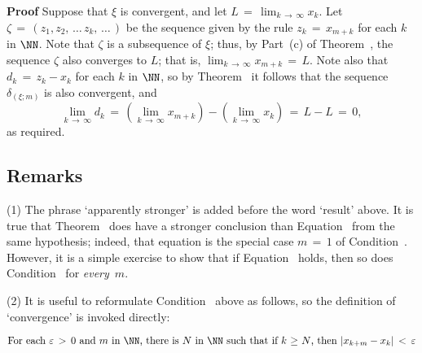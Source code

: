 \V

        {\bf Proof} Suppose that ${\xi}$ is convergent, and let $L \,=\, \lim_{k \,{\rightarrow}\, {\infty}} x_{k}$.
    Let ${\zeta} \,=\, (z_{1},z_{2},\,{\ldots}\,z_{k},\,{\ldots}\,)$ be the sequence given by the rule $z_{k} \,=\, x_{m+k}$ for each $k$ in ${\NN}$.
    Note that ${\zeta}$ is a subsequence of ${\xi}$; thus, by Part~(c) of Theorem~, the sequence ${\zeta}$ also converges to $L$; that is, $\lim_{k \,{\rightarrow}\, {\infty}} x_{m+k} \,=\, L$.
    Note also that $d_{k} \,=\, z_{k}-x_{k}$ for each $k$ in ${\NN}$, so by Theorem~
    it follows that the sequence ${\delta}_{({\xi};m)}$ is also convergent, and
        \begin{displaymath}
        \lim_{k \,{\rightarrow}\, {\infty}} d_{k} \,=\, \left(\lim_{k \,{\rightarrow}\, {\infty}} x_{m+k}\right) - \left(\lim_{k \,{\rightarrow}\, {\infty}} x_{k}\right) \,=\, L-L \,=\, 0,
        \end{displaymath}
    as required.

\V

            \subsection{\small{\bf Remarks}}
            \label{RemrkC70.12}

\V

\hspace*{\parindent}(1) The phrase `apparently stronger' is added before the word `result' above.
    It is true that Theorem~ does have a stronger conclusion than Equation~ from the same hypothesis;
    indeed, that equation is the special case $m \,=\, 1$ of Condition~.
    However, it is a simple exercise to show that if Equation~ holds, then so does Condition~ for {\em every}~$m$.


\V

        (2) It is useful to reformulate Condition~ above as follows, so the definition of `convergence' is invoked directly:


        \begin{equation}
        \label{CondC.30}
        \mbox{For each ${\varepsilon}\,>\,0$ and $m$ in ${\NN}$,  there is $N$ in ${\NN}$ such that if $k\,\,{\geq}\,\,N$, then $|x_{k+m}-x_{k}|\,<\,{\varepsilon}$}
        \end{equation}

